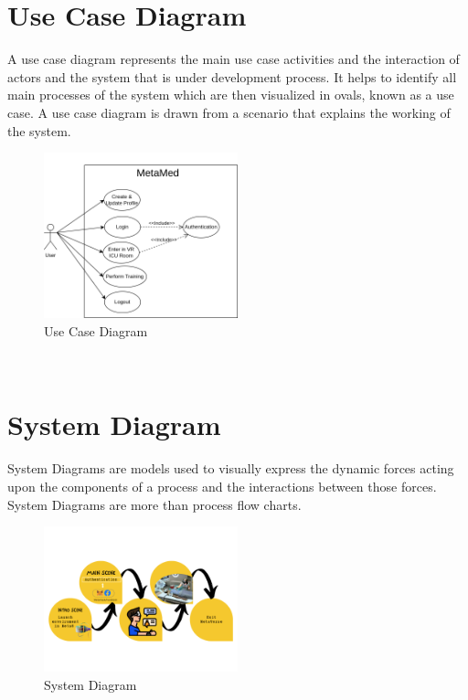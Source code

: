 \section{Use Case Diagram}
A use case diagram represents the main use case activities and the interaction of actors and the system that is under development process. It helps to identify all main processes of the system which are then visualized in ovals, known as a use case. A use case diagram is drawn from a scenario that explains the working of the system.
\begin{figure}[h]
    \centering
    \includegraphics[width=0.5\textwidth, height=0.3\textheight]{Images/Use Case.drawio.png}
    \caption{Use Case Diagram}
    \label{fig:system-diagram}
\end{figure}
\\
\section{System Diagram}
System Diagrams are models used to visually express the dynamic forces acting upon the components of a process and the interactions between those forces. System Diagrams are more than process flow charts.
\begin{figure}[h]
    \centering
    \includegraphics[width=0.5\textwidth, height=0.3\textheight]{Images/system.png}
    \caption{System Diagram}
    \label{fig:system-diagram}
\end{figure}
\\
